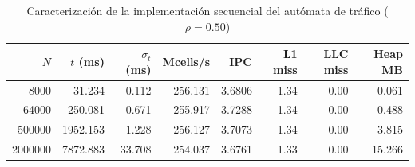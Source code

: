 \begin{table}[h]
\centering
\caption{Caracterización de la implementación secuencial del autómata de tráfico ($\rho=0.50$)}
\label{tab:profiling_seq}
\begin{tabular}{rrrrrrrr}
\hline
$N$ & $t$ (ms) & $\sigma_t$ (ms) & Mcells/s & IPC & L1 miss & LLC miss & Heap MB \\
\hline
8000 & 31.234 & 0.112 & 256.131 & 3.6806 & 1.34 & 0.00 & 0.061 \\
64000 & 250.081 & 0.671 & 255.917 & 3.7288 & 1.34 & 0.00 & 0.488 \\
500000 & 1952.153 & 1.228 & 256.127 & 3.7073 & 1.34 & 0.00 & 3.815 \\
2000000 & 7872.883 & 33.708 & 254.037 & 3.6761 & 1.33 & 0.00 & 15.266 \\
\hline
\end{tabular}
\end{table}